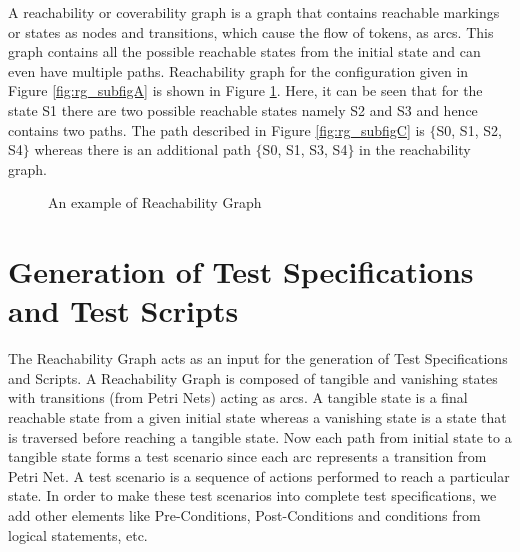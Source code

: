 A reachability or coverability graph is a graph that contains reachable markings or states as nodes and transitions, which cause the flow of tokens, as arcs. This graph contains all the possible reachable states from the initial state and can even have multiple paths. Reachability graph for the configuration given in Figure \ref{fig:rg_subfigA} is shown in Figure \ref{fig:rgexp}. Here, it can be seen that for the state S1 there are two possible reachable states namely S2 and S3 and hence contains two paths. The path described in Figure \ref{fig:rg_subfigC} is $ \lbrace $S0, S1, S2, S4$ \rbrace $ whereas there is an additional path $ \lbrace $S0, S1, S3, S4$ \rbrace $ in the reachability graph.

\begin{figure}[htb!]
\centering
{}
\caption{An example of Reachability Graph}
\label{fig:rgexp}
\end{figure}

\section{Generation of Test Specifications and Test Scripts}
The Reachability Graph acts as an input for the generation of Test Specifications and Scripts. A Reachability Graph is composed of tangible and vanishing states with transitions (from Petri Nets) acting as arcs. A tangible state is a final reachable state from a given initial state whereas a vanishing state is a state that is traversed before reaching a tangible state. Now each path from initial state to a tangible state forms a test scenario since each arc represents a transition from Petri Net. A test scenario is a sequence of actions performed to reach a particular state. In order to make these test scenarios into complete test specifications, we add other elements like Pre-Conditions, Post-Conditions and conditions from logical statements, etc. 

